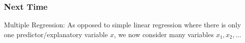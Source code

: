 \documentclass[slides]{beamer}
\newcommand{\blue}[1]{\textcolor{blue2}{#1}}
\begin{document}
%
%
%
%
%
%


\begin{frame}[fragile]
\frametitle{Next Time}

Multiple Regression:  As opposed to \blue{simple linear regression} where there is only one predictor/explanatory variable $x$, we now consider \blue{many} variables $x_1, x_2, \ldots$

\end{frame}
\end{document}
